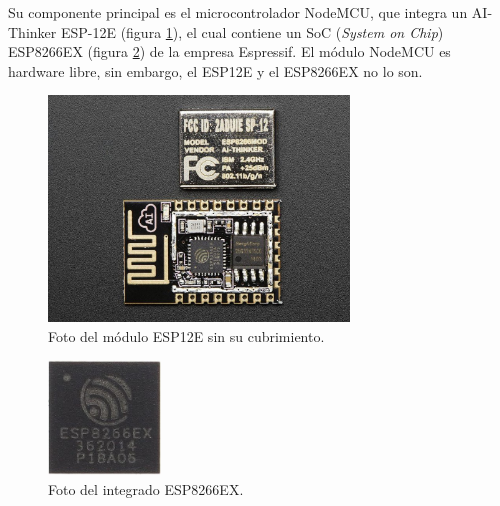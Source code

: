 Su componente principal es el microcontrolador NodeMCU, que integra un AI-Thinker ESP-12E (figura \ref{fig:foto-esp12e}), el cual contiene un SoC (\emph{System on Chip}) ESP8266EX (figura \ref{fig:esp8266ex}) de la empresa Espressif. El módulo NodeMCU es hardware libre, sin embargo, el ESP12E y el ESP8266EX no lo son.\cite{NodeMCU}

\begin{figure}[ht!]
	\begin{center}
		\includegraphics[width=8cm]{imagenes/esp12e-foto.jpg}
		\caption{Foto del módulo ESP12E sin su cubrimiento.}
		\label{fig:foto-esp12e}
	\end{center}
\end{figure}

\begin{figure}[ht!]
	\begin{center}
		\includegraphics[width=3cm]{imagenes/esp8266ex.jpg}
		\caption{Foto del integrado ESP8266EX.}
		\label{fig:esp8266ex}
	\end{center}
\end{figure}

